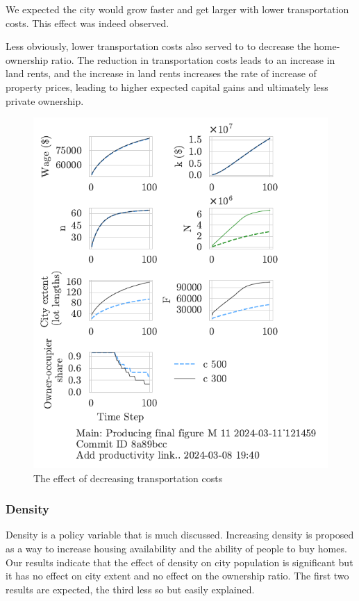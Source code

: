 We expected the city would grow faster and get larger with lower transportation costs. This effect was indeed observed. 

Less obviously, lower transportation costs also served to  to decrease the home-ownership ratio. The reduction in transportation costs leads to an increase in land rents, and the increase in land rents increases the rate of increase of property prices, leading to higher expected capital gains and ultimately less private ownership. 




\begin{figure}[h!t]
    \centering
    \includegraphics[scale=.8, trim={0 1.4cm 0 0},clip]{fig/c-Main-121459.pdf}
    \caption{The effect of decreasing transportation costs}
    \label{fig:c_ownership_trajectory}
\end{figure}


\newpage
\subsubsection{Density}
Density is a policy variable that is much discussed. Increasing density is proposed as a way to increase housing availability and the ability of people to buy homes. Our results indicate that the effect of density on city population is significant but it has no effect on city extent and no effect on the ownership ratio. The first two results are expected, the third less so but easily explained. 

